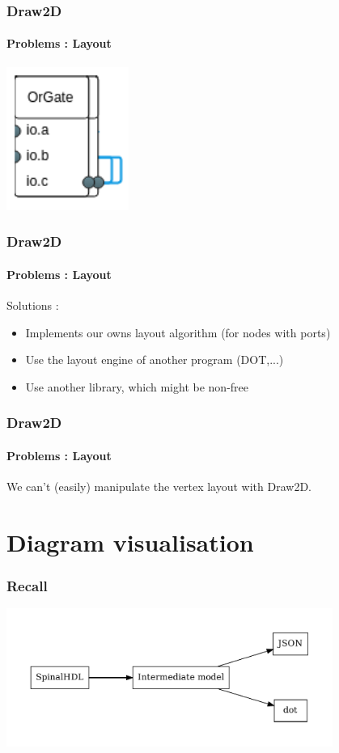 \documentclass[11pt, handout]{beamer}
\begin{document}
\begin{frame}
  \frametitle{Draw2D}
  \framesubtitle{Problems : Layout}
  \begin{center}
    \includegraphics[width=0.3\textwidth]{overlap_draw2d}
  \end{center}
\end{frame}

\begin{frame}
  \frametitle{Draw2D}
  \framesubtitle{Problems : Layout}
  Solutions :
  \begin{itemize}
  \item Implements our owns layout algorithm (for nodes with ports)
  \item Use the layout engine of another program (DOT,...)
  \item Use another library, which might be non-free
  \end{itemize}
\end{frame}

\begin{frame}
  \frametitle{Draw2D}
  \framesubtitle{Problems : Layout}
  \begin{tcolorbox}[colframe=red!75!black]
    We can't (easily) manipulate the vertex layout with Draw2D.
  \end{tcolorbox}
\end{frame}

\section{Diagram visualisation}

\begin{frame}
  \frametitle{Recall}
  \begin{center}
    \includegraphics[width=0.8\textwidth]{architecture}
  \end{center}
\end{frame}
\end{document}
